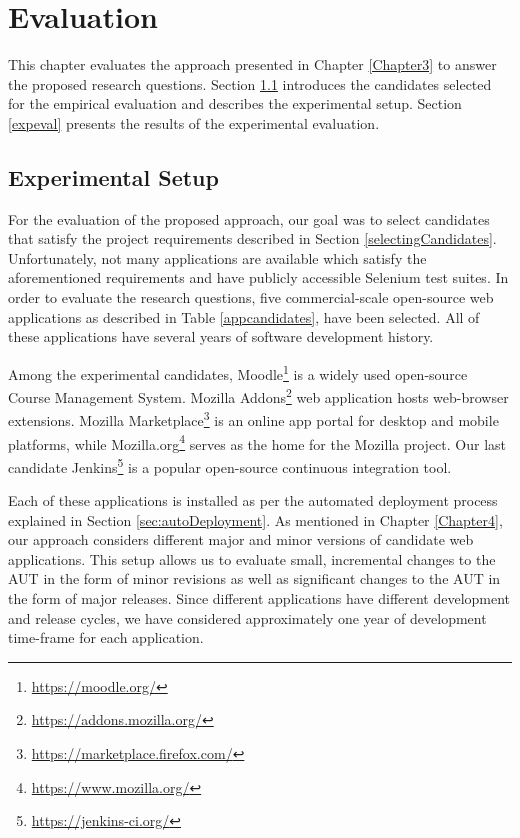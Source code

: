 \chapter{Evaluation} %

\label{Chapter6} %

This chapter evaluates the approach presented in Chapter \ref{Chapter3} to answer the proposed research questions. Section \ref{evalsetup} introduces the candidates selected for the empirical evaluation and describes the experimental setup. Section \ref{expeval} presents the results of the experimental evaluation.  

\section{Experimental Setup}
\label{evalsetup}
For the evaluation of the proposed approach, our goal was to select candidates that satisfy the project requirements described in Section \ref{selectingCandidates}. Unfortunately, not many applications are available which satisfy the aforementioned requirements and have publicly accessible Selenium test suites. In order to evaluate the research questions, five commercial-scale open-source web applications as described in Table \ref{appcandidates}, have been selected. All of these applications have several years of software development history.

Among the experimental candidates, Moodle\footnote{\url{https://moodle.org/}} is a widely used open-source Course Management System. Mozilla Addons\footnote{\url{https://addons.mozilla.org/}} web application hosts web-browser extensions. Mozilla Marketplace\footnote{\url{https://marketplace.firefox.com/}} is an online app portal for desktop and mobile platforms, while Mozilla.org\footnote{\url{https://www.mozilla.org/}} serves as the home for the Mozilla project. Our last candidate Jenkins\footnote{\url{https://jenkins-ci.org/}} is a popular open-source continuous integration tool. 
  
Each of these applications is installed as per the automated deployment process explained in Section \ref{sec:autoDeployment}. As mentioned in Chapter \ref{Chapter4}, our approach considers different major and minor versions of candidate web applications. This setup allows us to evaluate small, incremental changes to the AUT in the form of minor revisions as well as  significant changes to the AUT in the form of major releases. 
Since different applications have different development and release cycles, we have considered approximately one year of development time-frame for each application. 

